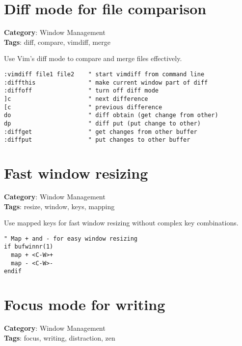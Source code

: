 {{{{{{{{{{{{{{{{{{\section{Diff mode for file comparison}

\textbf{Category}: Window Management\\ \textbf{Tags}: diff, compare, vimdiff, merge
\vspace{0.5cm}

Use Vim's diff mode to compare and merge files effectively.

\begin{Exa*}{}
\begin{Verbatim}[fontsize=\footnotesize, breaklines, breakanywhere]
:vimdiff file1 file2    " start vimdiff from command line
:diffthis               " make current window part of diff
:diffoff                " turn off diff mode
]c                      " next difference
[c                      " previous difference
do                      " diff obtain (get change from other)
dp                      " diff put (put change to other)
:diffget                " get changes from other buffer
:diffput                " put changes to other buffer
\end{Verbatim}
\end{Exa*}

\section{Fast window resizing}

\textbf{Category}: Window Management\\ \textbf{Tags}: resize, window, keys, mapping
\vspace{0.5cm}

Use mapped keys for fast window resizing without complex key combinations.

\begin{Exa*}{}
\begin{Verbatim}[fontsize=\footnotesize, breaklines, breakanywhere]
" Map + and - for easy window resizing
if bufwinnr(1)
  map + <C-W>+
  map - <C-W>-
endif
\end{Verbatim}
\end{Exa*}

\section{Focus mode for writing}

\textbf{Category}: Window Management\\ \textbf{Tags}: focus, writing, distraction, zen
\vspace{0.5cm}

}}}}}}}}}}}}}}}}}}
